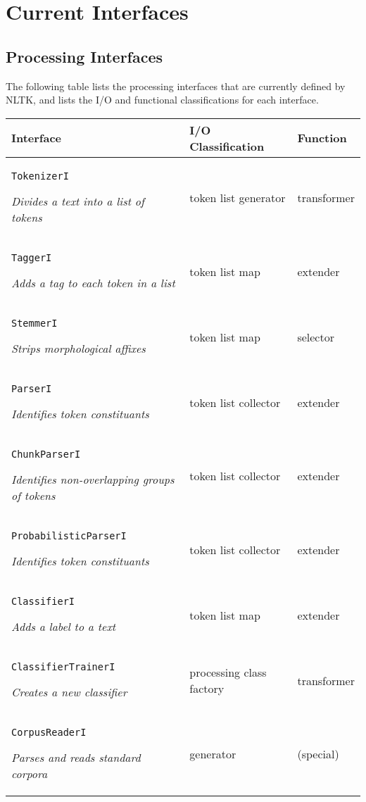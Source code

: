 \documentclass[11pt]{article}
\begin{document}
\section{Current Interfaces}
\subsection{Processing Interfaces}
The following table lists the processing interfaces that are currently
defined by NLTK, and lists the I/O and functional classifications for
each interface.

\vspace{3mm}\noindent
\begin{tabular}{|p{}|l|l|}
\hline
  \textbf{Interface} & \textbf{I/O Classification} &
  \textbf{Function} \\
\hline
\texttt{TokenizerI}
  
\textit{\qquad Divides a text into a list of tokens}
& token list generator & transformer \\
\hline
\texttt{TaggerI}

\textit{\qquad Adds a tag to each token in a list}
& token list map & extender \\
\hline
\texttt{StemmerI}

\textit{\qquad Strips morphological affixes}
& token list map & selector \\
\hline
\texttt{ParserI}

\textit{\qquad Identifies token constituants}
& token list collector & extender \\
\hline
\texttt{ChunkParserI}

\textit{\qquad Identifies non-overlapping groups of tokens}
& token list collector & extender \\
\hline
\texttt{ProbabilisticParserI}

\textit{\qquad Identifies token constituants}
& token list collector & extender \\
\hline
\texttt{ClassifierI}

\textit{\qquad Adds a label to a text}
& token list map & extender \\
\hline
\texttt{ClassifierTrainerI}

\textit{\qquad Creates a new classifier}
& processing class factory & transformer \\
\hline
\texttt{CorpusReaderI}

\textit{\qquad Parses and reads standard corpora}
& generator & (special)\\
\hline
\end{tabular}
\end{document}
